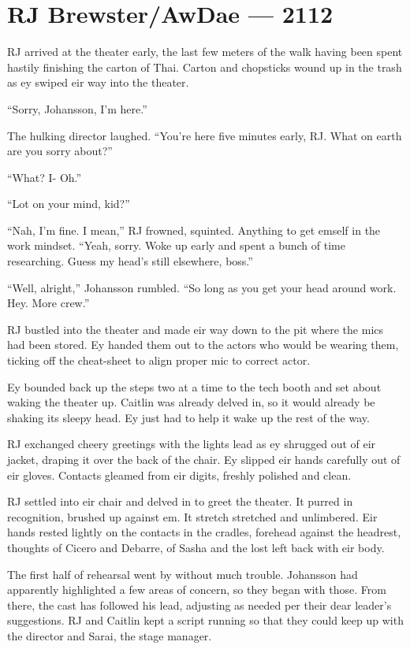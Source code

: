 \chapter*{RJ Brewster/AwDae — 2112}

RJ arrived at the theater early, the last few meters of the walk having been spent hastily finishing the carton of Thai. Carton and chopsticks wound up in the trash as ey swiped eir way into the theater.

``Sorry, Johansson, I'm here.''

The hulking director laughed. ``You're here five minutes early, RJ. What on earth are you sorry about?''

``What? I- Oh.''

``Lot on your mind, kid?''

``Nah, I'm fine. I mean,'' RJ frowned, squinted. Anything to get emself in the work mindset. ``Yeah, sorry. Woke up early and spent a bunch of time researching. Guess my head's still elsewhere, boss.''

``Well, alright,'' Johansson rumbled. ``So long as you get your head around work. Hey. More crew.''

RJ bustled into the theater and made eir way down to the pit where the mics had been stored. Ey handed them out to the actors who would be wearing them, ticking off the cheat-sheet to align proper mic to correct actor.

Ey bounded back up the steps two at a time to the tech booth and set about waking the theater up. Caitlin was already delved in, so it would already be shaking its sleepy head. Ey just had to help it wake up the rest of the way.

RJ exchanged cheery greetings with the lights lead as ey shrugged out of eir jacket, draping it over the back of the chair. Ey slipped eir hands carefully out of eir gloves. Contacts gleamed from eir digits, freshly polished and clean.

RJ settled into eir chair and delved in to greet the theater. It purred in recognition, brushed up against em. It stretch stretched and unlimbered. Eir hands rested lightly on the contacts in the cradles, forehead against the headrest, thoughts of Cicero and Debarre, of Sasha and the lost left back with eir body.

The first half of rehearsal went by without much trouble. Johansson had apparently highlighted a few areas of concern, so they began with those. From there, the cast has followed his lead, adjusting as needed per their dear leader's suggestions. RJ and Caitlin kept a script running so that they could keep up with the director and Sarai, the stage manager.

